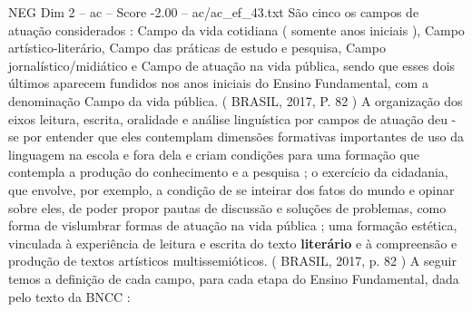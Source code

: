 \begin{textsample}{NEG Dim 2 – ac – Score -2.00 – ac/ac\_ef\_43.txt}
São cinco os campos de atuação considerados : Campo da vida cotidiana ( somente anos iniciais ), Campo artístico-literário, Campo das práticas de estudo e pesquisa, Campo jornalístico/midiático e Campo de atuação na vida pública, sendo que esses dois últimos aparecem fundidos nos anos iniciais do Ensino Fundamental, com a denominação Campo da vida pública. ( BRASIL, 2017, P. 82 ) A organização dos eixos leitura, escrita, oralidade e análise linguística por campos de atuação deu -se por entender que eles contemplam dimensões formativas importantes de uso da linguagem na escola e fora dela e criam condições para uma formação que contempla a produção do conhecimento e a pesquisa ; o exercício da cidadania, que envolve, por exemplo, a condição de se inteirar dos fatos do mundo e opinar sobre eles, de poder propor pautas de discussão e soluções de problemas, como forma de vislumbrar formas de atuação na vida pública ; uma formação estética, vinculada à experiência de leitura e escrita do texto \textbf{literário} e à compreensão e produção de textos artísticos multissemióticos. ( BRASIL, 2017, p. 82 ) A seguir temos a definição de cada campo, para cada etapa do Ensino Fundamental, dada pelo texto da BNCC :

\end{textsample}
